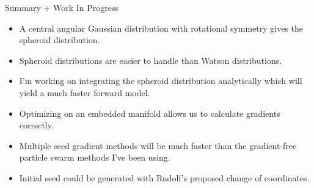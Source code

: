 \documentclass[presentation]{beamer}
\begin{document}
\begin{frame}[label=sec-9]{Summary + Work In Progress}
\begin{itemize}
\item A central angular Gaussian distribution with rotational symmetry gives the spheroid distribution.
\item Spheroid distributions are easier to handle than Watson distributions.
\item I'm working on integrating the spheroid distribution analytically which will yield a much faster forward model.
\item Optimizing on an embedded manifold allows us to calculate gradients correctly.
\item Multiple seed gradient methods will be much faster than the gradient-free particle swarm methods I've been using.
\item Initial seed could be generated with Rudolf's proposed change of coordinates.
\end{itemize}
\end{frame}
\end{document}
